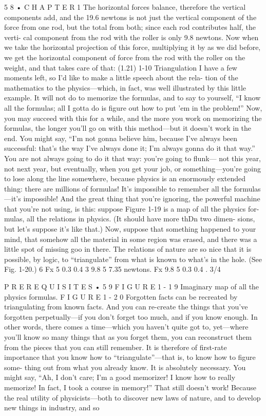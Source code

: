 \documentclass[10pt,oneside]{article}
\begin{document}
5 8 • C H A P T E R  1 The horizontal forces balance, therefore the vertical components add, and the 19.6 newtons is not just the vertical component of the force from one rod, but the total from both; since each rod contributes half, the verti- cal component from the rod with the roller is only 9.8 newtons. Now when we take the horizontal projection of this force, multiplying it by as we did before, we get the horizontal component of force from the rod with the roller on the weight, and that takes care of that: (1.21) 1-10 Triangulation I have a few moments left, so I’d like to make a little speech about the rela- tion of the mathematics to the physics---which, in fact, was well illustrated by this little example. It will not do to memorize the formulas, and to say to yourself, “I know all the formulas; all I gotta do is figure out how to put ’em in the problem!” Now, you may succeed with this for a while, and the more you work on memorizing the formulas, the longer you’ll go on with this method---but it doesn’t work in the end. You might say, “I’m not gonna believe him, because I’ve always been successful: that’s the way I’ve always done it; I’m always gonna do it that way.” You are not always going to do it that way: you’re going to flunk--- not this year, not next year, but eventually, when you get your job, or something---you’re going to lose along the line somewhere, because physics is an enormously extended thing: there are millions of formulas! It’s impossible to remember all the formulas---it’s impossible! And the great thing that you’re ignoring, the powerful machine that you’re not using, is this: suppose Figure 1-19 is a map of all the physics for- mulas, all the relations in physics. (It should have more thDn two dimen- sions, but let’s suppose it’s like that.) Now, suppose that something happened to your mind, that somehow all the material in some region was erased, and there was a little spot of missing goo in there. The relations of nature are so nice that it is possible, by logic, to “triangulate” from what is known to what’s in the hole. (See Fig. 1-20.) 6  Fx 5 0.3 0.4 3 9.8 5 7.35 newtons. Fx 9.8 5 0.3 0.4 . 3/4\par

P R E R E Q U I S I T E S • 5 9 F I G U R E 1 - 1 9 Imaginary map of all the physics formulas. F I G U R E 1 - 2 0 Forgotten facts can be recreated by triangulating from known facts. And you can re-create the things that you’ve forgotten perpetually---if you don’t forget too much, and if you know enough. In other words, there comes a time---which you haven’t quite got to, yet---where you’ll know so many things that as you forget them, you can reconstruct them from the pieces that you can still remember. It is therefore of first-rate importance that you know how to “triangulate”---that is, to know how to figure some- thing out from what you already know. It is absolutely necessary. You might say, “Ah, I don’t care; I’m a good memorizer! I know how to really memorize! In fact, I took a course in memory!” That still doesn’t work! Because the real utility of physicists---both to discover new laws of nature, and to develop new things in industry, and so\par
\end{document}

